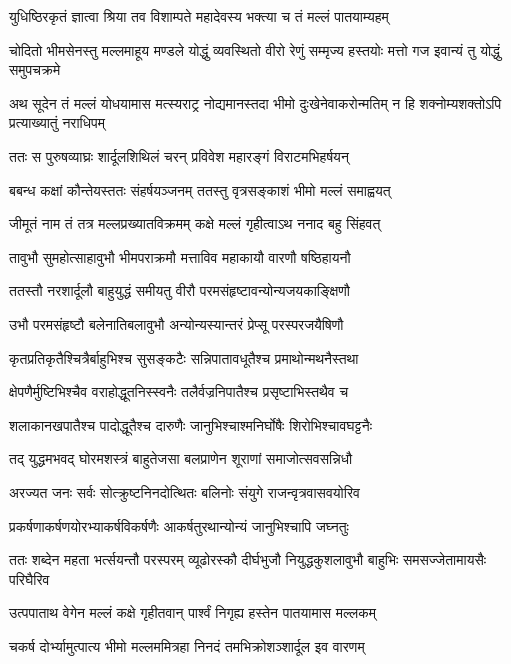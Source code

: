 \twolineshloka
{युधिष्ठिरकृतं ज्ञात्वा श्रिया तव विशाम्पते}
{महादेवस्य भक्त्या च तं मल्लं पातयाम्यहम्}



\threelineshloka
{चोदितो भीमसेनस्तु मल्लमाहूय मण्डले}
{योद्धुं व्यवस्थितो वीरो रेणुं सम्मृज्य हस्तयोः}
{मत्तो गज इवान्यं तु योद्धुं समुपचक्रमे}


\onelineshloka
{अथ सूदेन तं मल्लं योधयामास मत्स्यराट्र}
\twolineshloka
{नोद्यमानस्तदा भीमो दुःखेनेवाकरोन्मतिम्}
{न हि शक्नोम्यशक्तोऽपि प्रत्याख्यातुं नराधिपम्}


\twolineshloka
{ततः स पुरुषव्याघ्रः शार्दूलशिथिलं चरन्}
{प्रविवेश महारङ्गं विराटमभिहर्षयन्}


\twolineshloka
{बबन्ध कक्षां कौन्तेयस्ततः संहर्षयञ्जनम्}
{ततस्तु वृत्रसङ्काशं भीमो मल्लं समाह्वयत्}


\twolineshloka
{जीमूतं नाम तं तत्र मल्लप्रख्यातविक्रमम्}
{कक्षे मल्लं गृहीत्वाऽथ ननाद बहु सिंहवत्}


\twolineshloka
{तावुभौ सुमहोत्साहावुभौ भीमपराक्रमौ}
{मत्ताविव महाकायौ वारणौ षष्ठिहायनौ}


\twolineshloka
{ततस्तौ नरशार्दूलौ बाहुयुद्धं समीयतु}
{वीरौ परमसंहृष्टावन्योन्यजयकाङ्क्षिणौ}


\twolineshloka
{उभौ परमसंहृष्टौ बलेनातिबलावुभौ}
{अन्योन्यस्यान्तरं प्रेप्सू परस्परजयैषिणौ}


\twolineshloka
{कृतप्रतिकृतैश्चित्रैर्बाहुभिश्च सुसङ्कटैः}
{सन्निपातावधूतैश्च प्रमाथोन्मथनैस्तथा}


\twolineshloka
{क्षेपणैर्मुष्टिभिश्चैव वराहोद्धूतनिस्स्वनैः}
{तलैर्वज्रनिपातैश्च प्रसृष्टाभिस्तथैव च}


\twolineshloka
{शलाकानखपातैश्च पादोद्धूतैश्च दारुणैः}
{जानुभिश्चाश्मनिर्घोषैः शिरोभिश्चावघट्टनैः}


\twolineshloka
{तद् युद्धमभवद् घोरमशस्त्रं बाहुतेजसा}
{बलप्राणेन शूराणां समाजोत्सवसन्निधौ}


\twolineshloka
{अरज्यत जनः सर्वः सोत्क्रुष्टनिनदोत्थितः}
{बलिनोः संयुगे राजन्वृत्रवासवयोरिव}


\twolineshloka
{प्रकर्षणाकर्षणयोरभ्याकर्षविकर्षणैः}
{आकर्षतुरथान्योन्यं जानुभिश्चापि जघ्नतुः}


\threelineshloka
{ततः शब्देन महता भर्त्सयन्तौ परस्परम्}
{व्यूढोरस्कौ दीर्घभुजौ नियुद्धकुशलावुभौ}
{बाहुभिः समसज्जेतामायसैः परिघैरिव}


\twolineshloka
{उत्पपाताथ वेगेन मल्लं कक्षे गृहीतवान्}
{पार्श्वं निगृह्य हस्तेन पातयामास मल्लकम्}


\twolineshloka
{चकर्ष दोर्भ्यामुत्पात्य भीमो मल्लममित्रहा}
{निनदं तमभिक्रोशञ्शार्दूल इव वारणम्}


